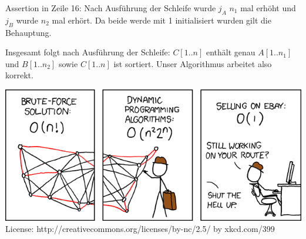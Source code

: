 \documentclass[18pt]{beamer}
\begin{document}
\begin{frame}{Assertion in Zeile 16:} 
Nach Ausführung der Schleife wurde $j_A$ $n_1$ mal erhöht und $j_B$ wurde $n_2$ mal erhört. Da beide werde mit 1 initialisiert wurden gilt die Behauptung.  

Insgesamt folgt nach Ausführung der Schleife:  $C[1..n]$ enthält genau $A[1..n_1]$ und $B[1..n_2]$ sowie $C[1..n]$ ist sortiert. Unser Algorithmus arbeitet also korrekt.
 
\end{frame}


\begin{frame}
\includegraphics[scale=0.5]{travelling_salesman_problem} \\
License: http://creativecommons.org/licenses/by-nc/2.5/
by xkcd.com/399
\end{frame}
\end{document}

